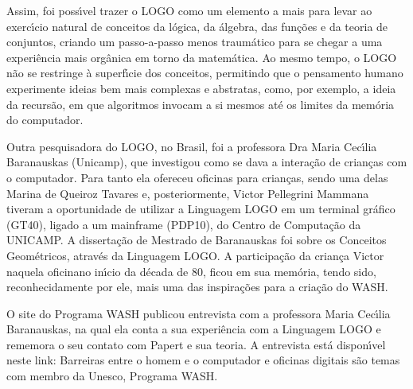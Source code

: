 \documentclass[
12pt,		%
openright,	%
twoside,  %
a4paper,			%
chapter=TITLE,		%
english,			%
french,				%
spanish,			%
brazil				%
]{USPSC-classe/USPSC}
\begin{document}
Assim, foi poss\'{\i}vel trazer o LOGO como um elemento a mais para levar ao exerc\'{\i}cio natural de conceitos da l\'ogica, da \'algebra, das fun\c{c}\~oes e da teoria de conjuntos, criando um passo-a-passo menos traum\'atico para se chegar a uma experi\^encia mais org\^anica em torno da matem\'atica. Ao mesmo tempo, o LOGO n\~ao se restringe \`a superf\'{\i}cie dos conceitos, permitindo que o pensamento humano experimente ideias bem mais complexas e abstratas, como, por exemplo, a ideia da recurs\~ao, em que algoritmos invocam a si mesmos at\'e os limites da mem\'oria do computador.

















Outra pesquisadora do LOGO, no Brasil, foi a professora  Dra Maria Cec\'{\i}lia Baranauskas (Unicamp), que investigou como  se dava a intera\c{c}\~ao de crian\c{c}as com o computador. Para tanto ela ofereceu oficinas para  crian\c{c}as, sendo uma delas Marina de Queiroz Tavares  e, posteriormente, Victor Pellegrini Mammana  tiveram a oportunidade  de  utilizar a Linguagem LOGO em um terminal gr\'afico (GT40), ligado a um mainframe (PDP10), do Centro de Computa\c{c}\~ao da UNICAMP. A disserta\c{c}\~ao de Mestrado de Baranauskas foi sobre os \textquotedbl Conceitos Geom\'etricos, atrav\'es da Linguagem LOGO\textquotedbl . A participa\c{c}\~ao da crian\c{c}a Victor naquela \textquotedbl oficina\textquotedbl  no in\'{\i}cio da d\'ecada de 80, ficou em sua mem\'oria, tendo sido, reconhecidamente por ele, mais uma das inspira\c{c}\~oes para a cria\c{c}\~ao do WASH.

















O site do Programa WASH publicou entrevista com a professora Maria Cec\'{\i}lia Baranauskas, na qual ela conta a sua experi\^encia com a Linguagem LOGO e rememora o seu contato com Papert e sua teoria. A entrevista est\'a dispon\'{\i}vel neste link: \textquotedbl Barreiras entre o homem e o computador e oficinas digitais s\~ao temas com membro da Unesco, Programa WASH\textquotedbl .
\end{document}
